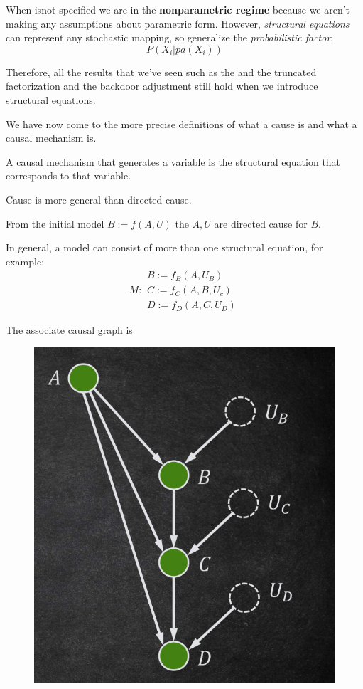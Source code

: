 When isnot specified we are in the \textbf{nonparametric regime} because we aren't making 
any assumptions about parametric form. However, \textit{structural equations} can 
represent any stochastic mapping, so generalize the \textit{probabilistic factor}:
\begin{equation}
    P(X_i|pa(X_i))
\end{equation}

Therefore, all the results that we've seen such as the and the truncated factorization and the 
backdoor adjustment still hold when we introduce structural equations.

We have now come to the more precise definitions of what a cause is and what a causal
mechanism is.

\begin{definition}
    A causal mechanism that generates a variable is the structural equation 
    that corresponds to that variable.
\end{definition}

\begin{note}
    Cause is more general than directed cause.
\end{note}

From the initial model $B:=f(A,U)$ the $A,U$ are directed cause for $B$.


In general, a model can consist of more than one structural equation, for example:
\begin{equation}
    M : \begin{array}{l}
        B := f_B(A, U_B) \\ C := f_C(A, B, U_c) \\ D := f_D(A, C, U_D)
    \end{array}
\end{equation}

The associate causal graph is

\begin{figure}[h]
    \centering
    \includegraphics*[width=0.5 \textwidth]{img/graph_associate_structural_equation.png}
\end{figure}

